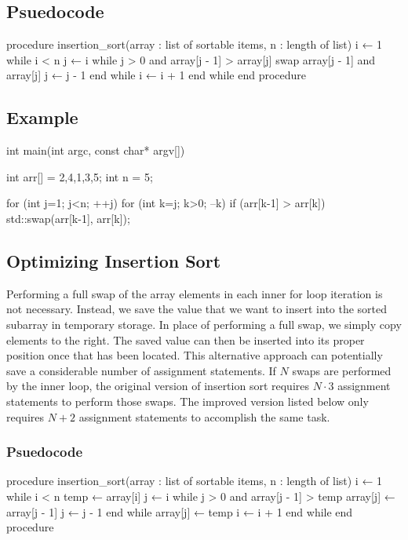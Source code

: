 \documentclass{report}
\begin{document}
    \subsection{Psuedocode}
    \begin{cppcode}
procedure insertion_sort(array : list of sortable items, n : length of list)
    i ← 1
    while i < n
        j ← i
        while j > 0 and array[j - 1] > array[j]
            swap array[j - 1] and array[j]
            j ← j - 1
        end while
        i ← i + 1
    end while
end procedure
    \end{cppcode}

    \bigbreak \noindent 
    \subsection{Example}
    \bigbreak \noindent 
    \begin{cppcode}
        int main(int argc, const char* argv[]) {
            int arr[] = {2,4,1,3,5};
            int n = 5;

            for (int j=1; j<n; ++j) {
                for (int k=j; k>0; --k) {
                    if (arr[k-1] > arr[k]) {
                        std::swap(arr[k-1], arr[k]);
                    }
                }
            }
        }
    \end{cppcode}


    \pagebreak 
    \subsection{Optimizing Insertion Sort}
    \bigbreak \noindent 
    Performing a full swap of the array elements in each inner for loop iteration is not necessary. Instead, we save the value that we want to insert into the sorted subarray in temporary storage. In place of performing a full swap, we simply copy elements to the right. The saved value can then be inserted into its proper position once that has been located.
    \bigbreak \noindent 
    This alternative approach can potentially save a considerable number of assignment statements. If $N$ swaps are performed by the inner loop, the original version of insertion sort requires $N \cdot 3 $ assignment statements to perform those swaps. The improved version listed below only requires $N+2$ assignment statements to accomplish the same task.
    \subsubsection{Psuedocode}
    \bigbreak \noindent 
    \begin{cppcode}
procedure insertion_sort(array : list of sortable items, n : length of list)
    i ← 1
    while i < n
        temp ← array[i]
        j ← i
        while j > 0 and array[j - 1] > temp
            array[j] ← array[j - 1]
            j ← j - 1
        end while
        array[j] ← temp
        i ← i + 1
    end while
end procedure
    \end{cppcode}
\end{document}
